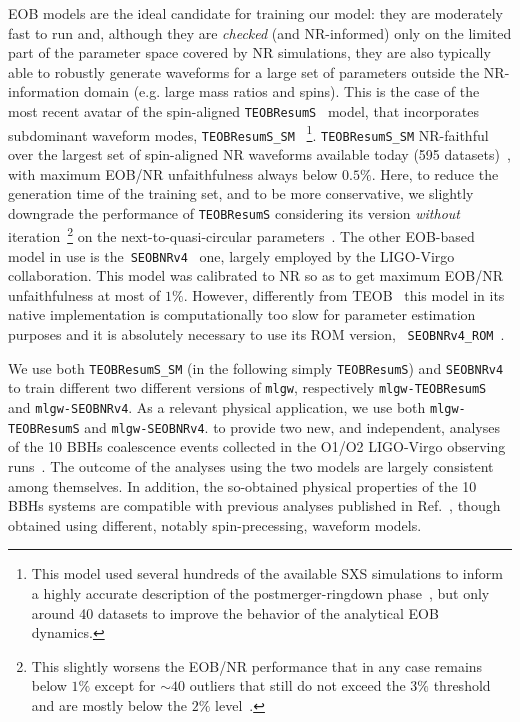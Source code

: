EOB models are the ideal candidate for training our model: they are moderately fast to run 
and, although they are {\it checked} (and NR-informed) only on the limited part of the 
parameter space covered by NR simulations,  they are also typically able to robustly 
generate waveforms for a large set of parameters outside the NR-information 
domain (e.g. large mass ratios and spins).
This is the case of the most recent avatar of the spin-aligned \texttt{TEOBResumS}~\cite{Nagar:2018zoe} 
model, that incorporates subdominant waveform modes, \texttt{TEOBResumS\_SM}~\cite{Nagar:2019wds,Nagar:2020pcj}
\footnote{This model used several hundreds of the available SXS simulations to inform a highly 
accurate description of the postmerger-ringdown phase~\cite{Damour:2014yha}, but 
only around 40 datasets to improve the behavior of the analytical EOB dynamics.}.
\texttt{TEOBResumS\_SM}   NR-faithful over the largest set of spin-aligned NR waveforms 
available today (595 datasets)~\cite{Nagar:2020pcj}, with maximum EOB/NR unfaithfulness 
always below $0.5\%$. Here, to reduce the generation time of the training set, and to be more 
conservative, we slightly downgrade the performance of \texttt{TEOBResumS} considering 
its version {\it without} iteration~\footnote{This slightly worsens the EOB/NR performance that in
any case remains below $1\%$ except for $\sim 40$ outliers that still do not exceed the $3\%$ 
threshold and are mostly below the $2\%$ level~\cite{Riemenschneider:2020}.} on 
the next-to-quasi-circular parameters~\cite{Nagar:2020pcj}.
The other EOB-based model in 
use is the~\texttt{SEOBNRv4}~\cite{Taracchini:2013rva,Bohe:2016gbl} one, largely employed 
by the LIGO-Virgo collaboration. This model was calibrated to NR so as to get  
maximum EOB/NR unfaithfulness at most of $1\%$. However, differently from 
TEOB~\cite{Nagar:2018zoe} this model in its native implementation is computationally 
too slow for parameter estimation purposes and it is absolutely necessary 
to use its ROM version, ~\texttt{SEOBNRv4\_ROM}~\cite{Bohe:2016gbl}.

We use both \texttt{TEOBResumS\_SM} (in the following simply \texttt{TEOBResumS}) 
and \texttt{SEOBNRv4} to train different two different versions of \texttt{mlgw}, respectively
\texttt{mlgw-TEOBResumS} and \texttt{mlgw-SEOBNRv4}.
As a relevant physical application, we use both 
\texttt{mlgw-TEOBResumS} and \texttt{mlgw-SEOBNRv4}.
to provide two new, and independent, analyses of the 10 BBHs 
coalescence events collected in the O1/O2 LIGO-Virgo observing 
runs~\cite{LIGOScientific:2018mvr}. The outcome of the analyses 
using the two models are largely consistent among themselves.
In addition,  the so-obtained physical properties of the 10 BBHs
systems are compatible with previous analyses published in
Ref.~\cite{LIGOScientific:2018mvr}, though obtained using
different, notably spin-precessing, waveform models.

